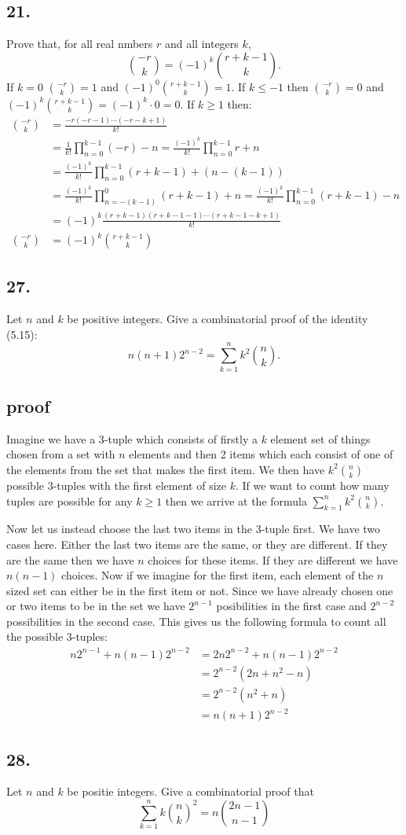 \documentclass{article}
\begin{document}
\subsection*{21.}
Prove that, for all real nmbers $r$ and all integers $k$,
\[\binom{-r}{k}=(-1)^k\binom{r+k-1}{k}.\]
If $k=0$ $\binom{-r}{k}=1$ and $(-1)^0\binom{r+k-1}{k}=1$. If $k\le-1$ then $\binom{-r}{k}=0$ and $(-1)^k\binom{r+k-1}{k}=(-1)^k\cdot0=0$. If $k\ge1$ then:
\begin{align*}
  \binom{-r}{k}&=\frac{-r(-r-1)\cdots(-r-k+1)}{k!}\\
  &=\frac{1}{k!}\prod_{n=0}^{k-1}{(-r)-n}=\frac{(-1)^k}{k!}\prod_{n=0}^{k-1}{r+n}\\
  &=\frac{(-1)^k}{k!}\prod_{n=0}^{k-1}{(r+k-1)+(n-(k-1))}\\
  &=\frac{(-1)^k}{k!}\prod_{n=-(k-1)}^{0}{(r+k-1)+n}=\frac{(-1)^k}{k!}\prod_{n=0}^{k-1}{(r+k-1)-n}\\
  &=(-1)^k\frac{(r+k-1)(r+k-1-1)\cdots(r+k-1-k+1)}{k!}\\
  \binom{-r}{k}&=(-1)^k\binom{r+k-1}{k}
\end{align*}
\subsection*{27.}
Let $n$ and $k$ be positive integers. Give a combinatorial proof of the identity (5.15):
\[n(n+1)2^{n-2}=\sum\limits_{k=1}^n{k^2\binom{n}{k}}.\]
\subsection*{proof}
Imagine we have a 3-tuple which consists of firstly a $k$ element set of things chosen from a set with $n$ elements and then 2 items which each consist of one of the elements from the set that makes the first item. We then have $k^2\binom{n}{k}$ possible 3-tuples with the first element of size $k$. If we want to count how many tuples are possible for any $k\ge1$ then we arrive at the formula $\sum\limits_{k=1}^n{k^2\binom{n}{k}}$.

Now let us instead choose the last two items in the 3-tuple first. We have two cases here. Either the last two items are the same, or they are different. If they are the same then we have $n$ choices for these items. If they are different we have $n(n-1)$ choices. Now if we imagine for the first item, each element of the $n$ sized set can either be in the first item or not. Since we have already chosen one or two items to be in the set we have $2^{n-1}$ posibilities in the first case and $2^{n-2}$ possibilities in the second case. This gives us the following formula to count all the possible 3-tuples:
\begin{align*}
  n2^{n-1}+n(n-1)2^{n-2}&=2n2^{n-2}+n(n-1)2^{n-2}\\
  &=2^{n-2}(2n+n^2-n)\\
  &=2^{n-2}(n^2+n)\\
  &=n(n+1)2^{n-2}
\end{align*}
\subsection*{28.}
Let $n$ and $k$ be positie integers. Give a combinatorial proof that
\[\sum\limits_{k=1}^n{k\binom{n}{k}^2}=n\binom{2n-1}{n-1}\]
\end{document}
